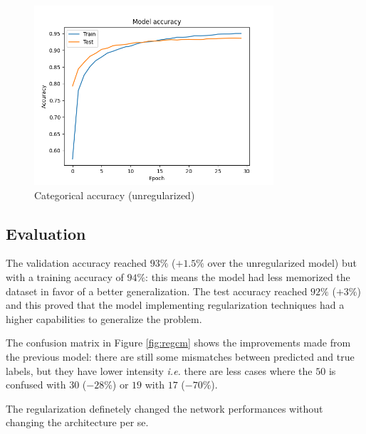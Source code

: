 \documentclass[compsoc]{IEEEtran}
\begin{document}
\begin{figure}[ht!]
\centering                                                                        
\includegraphics[width=3.5in]{../images/reg/accuracy-LeakyReLU-NoneType-categorical_crossentropy-Adam-50-256-0.1-final.png}
\captionsetup{justification=centering}                                                                                                                            
\caption{Categorical accuracy (unregularized)}
\label{fig:acc2}                                                                                                                                          
\end{figure} 


\subsection{Evaluation}

The validation accuracy reached $93\%$ ($+1.5\%$ over the unregularized model) but with a training accuracy of $94\%$: this means the model had less memorized the dataset in favor of a better generalization. The test accuracy reached $92\%$ ($+3\%$) and this proved that the model implementing regularization techniques 
had a higher capabilities to generalize the problem. \par
The confusion matrix in Figure \ref{fig:regcm} shows the improvements made from the previous model: there are still some mismatches between predicted and true labels, but they have lower intensity \emph{i.e.} there are less cases where the $50$ is confused with $30$ ($-28\%$) or $19$ with $17$ ($-70\%$).\par
The regularization definetely changed the network performances without changing the architecture per se.
\end{document}
